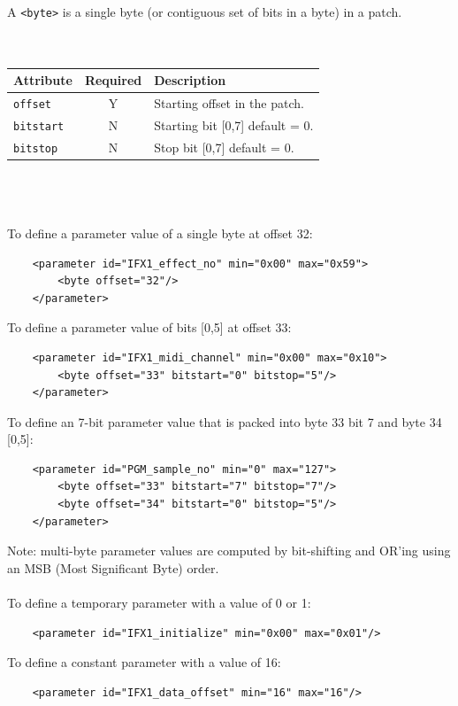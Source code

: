 \documentclass[a4paper,twoside,12pt]{article}
\newcommand{\code}[1]{\color{red}\texttt{#1}\color{black}}
\begin{document}
A \code{<byte>}{} is a single byte (or contiguous set of bits in a
byte) in a patch.
\\
\\
\\
\begin{tabular}{|l|c|p{9cm}|}
\hline
Attribute & Required & Description \\
\hline
\code{offset} & Y & Starting offset in the patch.  \\
\code{bitstart} & N & Starting bit [0,7] default = 0.  \\
\code{bitstop} & N & Stop bit [0,7] default = 0.  \\
\hline
\end{tabular}
\\
\\
\\
To define a parameter value of a single byte at offset 32:
\begin{verbatim}
    <parameter id="IFX1_effect_no" min="0x00" max="0x59">
        <byte offset="32"/>
    </parameter>
\end{verbatim}

To define a parameter value of bits [0,5] at offset 33:
\begin{verbatim}
    <parameter id="IFX1_midi_channel" min="0x00" max="0x10">
        <byte offset="33" bitstart="0" bitstop="5"/>
    </parameter>
\end{verbatim}

To define an 7-bit parameter value that is packed into byte 33 bit
7 and byte 34 [0,5]:
\begin{verbatim}
    <parameter id="PGM_sample_no" min="0" max="127">
        <byte offset="33" bitstart="7" bitstop="7"/>
        <byte offset="34" bitstart="0" bitstop="5"/>
    </parameter>
\end{verbatim}

Note: multi-byte parameter values are computed by bit-shifting and
OR'ing using an MSB (Most Significant Byte) order. \\
\\
To define a temporary parameter with a value of 0 or 1:
\begin{verbatim}
    <parameter id="IFX1_initialize" min="0x00" max="0x01"/>
\end{verbatim}

To define a constant parameter with a value of 16:
\begin{verbatim}
    <parameter id="IFX1_data_offset" min="16" max="16"/>
\end{verbatim}
\end{document}
